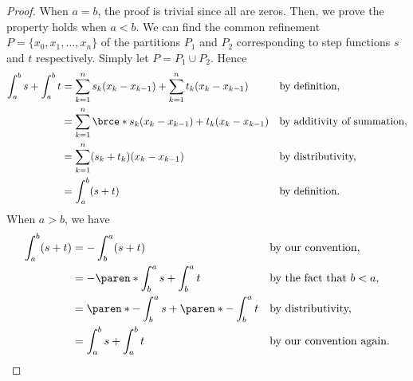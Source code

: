 \documentclass[a4paper]{article}
\begin{document}
\begin{enumerate}
  \begin{proof}
    When \(a=b\), the proof is trivial since all are zeros.  Then, we
    prove the property holds when \(a < b\).  We can find the common
    refinement \(P = \{x_0, x_1, \dotsc, x_n\}\) of the partitions \(P_1\)
    and \(P_2\) corresponding to step functions \(s\) and \(t\)
    respectively.  Simply let \(P = P_1 \cup P_2\). Hence
    \begin{align*}
      \int_a^b s + \int_a^b t
        &= \sum_{k=1}^n s_k (x_k - x_{k-1}) + \sum_{k=1}^n t_k (x_k - x_{k-1})
      && \reason{by definition,} \\
        &= \sum_{k=1}^n \brce*{s_k (x_k - x_{k-1}) + t_k (x_k - x_{k-1})}
      && \reason{by additivity of summation,} \\
        &=\sum_{k=1}^n (s_k + t_k)(x_k - x_{k-1})
      && \reason{by distributivity,} \\
        &= \int_a^b (s + t)
      && \reason{by definition.}
    \end{align*}
    When \(a > b\), we
    have
    \begin{align*}
      \int_a^b (s + t)
        &= -\int_b^a (s + t)                            && \reason{by our convention,} \\
        &= -\paren*{\int_b^a s + \int_b^a t}            && \reason{by the fact that \(b < a\),} \\
        &= \paren*{-\int_b^a s} + \paren*{- \int_b^a t} && \reason{by distributivity,} \\
        &= \int_a^b s + \int_a^b t                      && \reason{by our convention again.} \qedhere
    \end{align*}
  \end{proof}
\end{enumerate}
\end{document}
